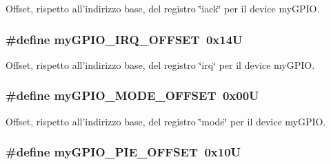 Offset, rispetto all'indirizzo base, del registro \char`\"{}iack\char`\"{} per il device my\+G\+P\+I\+O. 

\hypertarget{group__bare-metal_ga31a7c2a9de5c63576f2f5aa061b936c5}{
\subsubsection[{my\+G\+P\+I\+O\+\_\+\+I\+R\+Q\+\_\+\+O\+F\+F\+S\+E\+T}]{\setlength{\rightskip}{0pt plus 5cm}\#define my\+G\+P\+I\+O\+\_\+\+I\+R\+Q\+\_\+\+O\+F\+F\+S\+E\+T~0x14\+U}}\label{group__bare-metal_ga31a7c2a9de5c63576f2f5aa061b936c5}


Offset, rispetto all'indirizzo base, del registro \char`\"{}irq\char`\"{} per il device my\+G\+P\+I\+O. 

\hypertarget{group__bare-metal_ga81a662103d6ed053978c0a9b4c273065}{
\subsubsection[{my\+G\+P\+I\+O\+\_\+\+M\+O\+D\+E\+\_\+\+O\+F\+F\+S\+E\+T}]{\setlength{\rightskip}{0pt plus 5cm}\#define my\+G\+P\+I\+O\+\_\+\+M\+O\+D\+E\+\_\+\+O\+F\+F\+S\+E\+T~0x00\+U}}\label{group__bare-metal_ga81a662103d6ed053978c0a9b4c273065}


Offset, rispetto all'indirizzo base, del registro \char`\"{}mode\char`\"{} per il device my\+G\+P\+I\+O. 

\hypertarget{group__bare-metal_gaece3c1c9f504249d6b8ab060d8bb2738}{
\subsubsection[{my\+G\+P\+I\+O\+\_\+\+P\+I\+E\+\_\+\+O\+F\+F\+S\+E\+T}]{\setlength{\rightskip}{0pt plus 5cm}\#define my\+G\+P\+I\+O\+\_\+\+P\+I\+E\+\_\+\+O\+F\+F\+S\+E\+T~0x10\+U}}\label{group__bare-metal_gaece3c1c9f504249d6b8ab060d8bb2738}


